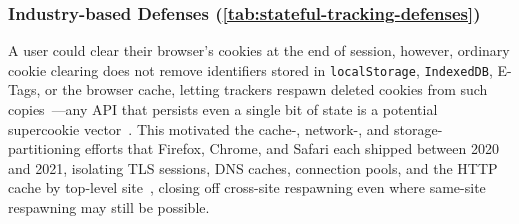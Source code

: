 % 


\subsubsection{Industry-based Defenses (\autoref{tab:stateful-tracking-defenses})}
\label{sec:stateful-defenses-industry}



\label{sec:stateful-defenses-evercookie}
%
A user could clear their browser's cookies at the end of session, however, ordinary cookie clearing does not remove identifiers stored in \texttt{localStorage}, \texttt{IndexedDB}, E-Tags, or the browser cache, letting trackers respawn deleted cookies from such copies~\cite{ayensonFlashCookiesPrivacy2011,acarFPDetectiveDustingWeb2013,sorensenZombiecookiesCaseStudies2013}---any API that persists even a single bit of state is a potential supercookie vector~\cite{soltaniFlashCookiesPrivacy2009,aliNavigatingMurkyWaters2023,kamkarSamyKamkarEvercookie2010,klink1334485TrackingUsing2017}.
%
This motivated the cache-, network-, and storage-partitioning efforts that Firefox, Chrome, and Safari each shipped between 2020 and 2021, isolating TLS sessions, DNS caches, connection pools, and the HTTP cache by top-level site~\cite{menkeStorageIsolationProject2020,privacycommunitygroupClientSideStoragePartitioning2022,mdnStatePartitioningPrivacy2024}, closing off cross-site respawning even where same-site respawning may still be possible.


